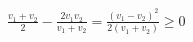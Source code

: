 \documentclass[border=2.5pt]{standalone}
\begin{document}
$\displaystyle \frac{v_1+v_2}{2}-\frac{2v_1v_2}{v_1+v_2} =\frac{(v_1-v_2)^2}{2(v_1+v_2)}\ge0$
\end{document}
